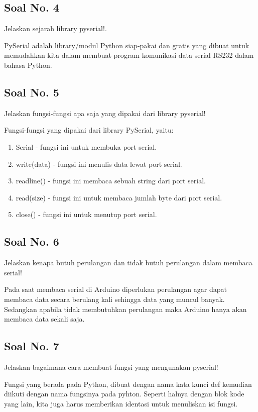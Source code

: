 \subsection{Soal No. 4}
Jelaskan sejarah library pyserial!.

\hfill \break
PySerial adalah library/modul Python siap-pakai dan gratis yang dibuat untuk memudahkan kita dalam membuat program komunikasi data serial RS232 dalam bahasa Python.

\subsection{Soal No. 5}
Jelaskan fungsi-fungsi apa saja yang dipakai dari library pyserial!

\hfill \break
Fungsi-fungsi yang dipakai dari library PySerial, yaitu:
\begin{enumerate}
	\item Serial - fungsi ini untuk membuka port serial.
	\item write(data) - fungsi ini menulis data lewat port serial.
	\item readline() - fungsi ini membaca sebuah string dari port serial.
	\item read(size) - fungsi ini untuk membaca jumlah byte dari port serial.
	\item close() - fungsi ini untuk menutup port serial.
\end{enumerate}

\subsection{Soal No. 6}
Jelaskan kenapa butuh perulangan dan tidak butuh perulangan dalam membaca serial!

\hfill \break
Pada saat membaca serial di Arduino diperlukan perulangan agar dapat membaca data secara berulang kali sehingga data yang muncul banyak. Sedangkan apabila tidak membutuhkan perulangan maka Arduino hanya akan membaca data sekali saja.

\subsection{Soal No. 7}
Jelaskan bagaimana cara membuat fungsi yang mengunakan pyserial!

\hfill \break
Fungsi yang berada pada Python, dibuat dengan nama kata kunci def kemudian diikuti dengan nama fungsinya pada pyhton.
Seperti halnya dengan blok kode yang lain, kita juga harus memberikan identasi untuk menuliskan isi fungsi.

